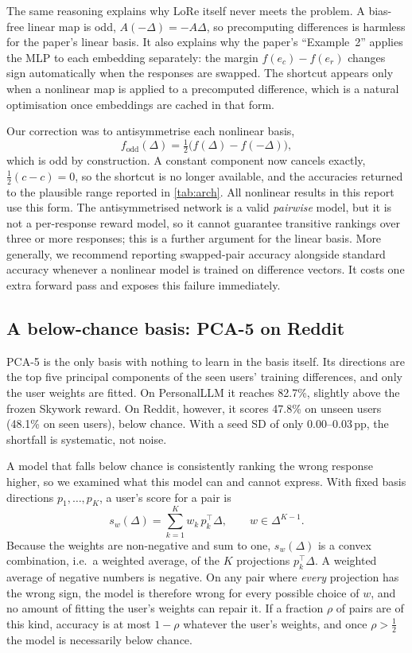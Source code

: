 \documentclass[11pt,a4paper]{article}
\newcommand{\simplex}{\Delta^{K-1}}
\newcommand{\pp}{\,pp\xspace}
\begin{document}
The same reasoning explains why LoRe itself never meets the problem. A bias-free linear map is odd,
$A(-\Delta)=-A\Delta$, so precomputing differences is harmless for the paper's linear basis. It also
explains why the paper's ``Example~2'' applies the MLP to each embedding separately: the margin
$f(e_c)-f(e_r)$ changes sign automatically when the responses are swapped. The shortcut appears only
when a nonlinear map is applied to a precomputed difference, which is a natural optimisation once
embeddings are cached in that form.

Our correction was to antisymmetrise each nonlinear basis,
\[
f_\text{odd}(\Delta)=\tfrac12\big(f(\Delta)-f(-\Delta)\big),
\]
which is odd by construction. A constant component now cancels exactly, $\tfrac12(c-c)=0$, so the
shortcut is no longer available, and the accuracies returned to the plausible range reported in
\cref{tab:arch}. All nonlinear results in this report use this form. The antisymmetrised network is a
valid \emph{pairwise} model, but it is not a per-response reward model, so it cannot guarantee
transitive rankings over three or more responses; this is a further argument for the linear basis.
More generally, we recommend reporting swapped-pair accuracy alongside standard accuracy whenever a
nonlinear model is trained on difference vectors. It costs one extra forward pass and exposes this
failure immediately.

\subsection{A below-chance basis: PCA-5 on Reddit}
\label{sec:simplex}

PCA-5 is the only basis with nothing to learn in the basis itself. Its directions are the top five
principal components of the seen users' training differences, and only the user weights are fitted.
On PersonalLLM it reaches 82.7\%, slightly above the frozen Skywork reward. On Reddit, however, it
scores 47.8\% on unseen users (48.1\% on seen users), below chance. With a seed SD of only 0.00--0.03\pp,
the shortfall is systematic, not noise.

A model that falls below chance is consistently ranking the wrong response higher, so we examined what
this model can and cannot express. With fixed basis directions $p_1,\dots,p_K$, a user's score for a
pair is
\[
s_w(\Delta)=\sum_{k=1}^{K} w_k\,p_k^\top\Delta,\qquad w\in\simplex .
\]
Because the weights are non-negative and sum to one, $s_w(\Delta)$ is a convex combination, i.e.\ a
weighted average, of the $K$ projections $p_k^\top\Delta$. A weighted average of negative numbers is
negative. On any pair where \emph{every} projection has the wrong sign, the model is therefore wrong
for every possible choice of $w$, and no amount of fitting the user's weights can repair it. If a
fraction $\rho$ of pairs are of this kind, accuracy is at most $1-\rho$ whatever the user's weights,
and once $\rho>\tfrac12$ the model is necessarily below chance.
\end{document}
